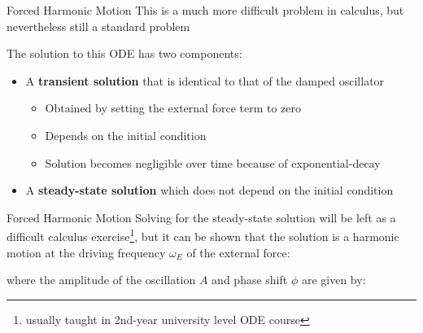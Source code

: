 \documentclass[12pt,compress,aspectratio=169]{beamer}
\begin{document}
\begin{frame}{Forced Harmonic Motion}
  This is a much more difficult problem in calculus, but nevertheless still a
  standard problem
  
  
  The solution to this ODE has two components:
  \begin{itemize}
  \item A \textbf{transient solution} that is identical to that of the damped
    oscillator
    \begin{itemize}
    \item Obtained by setting the external force term to zero
    \item Depends on the initial condition
    \item Solution becomes negligible over time because of exponential-decay
    \end{itemize}
  \item A \textbf{steady-state solution} which does not depend on the initial
    condition
  \end{itemize}
\end{frame}



\begin{frame}{Forced Harmonic Motion}
  Solving for the steady-state solution will be left as a difficult calculus
  exercise\footnote{usually taught in 2nd-year university level ODE course},
  but it can be shown that the solution is a harmonic motion at the driving
  frequency $\omega_E$ of the external force:

  
  where the amplitude of the oscillation $A$ and phase shift $\phi$ are given
  by:

  \vspace{.3in}
\end{frame}
\end{document}
